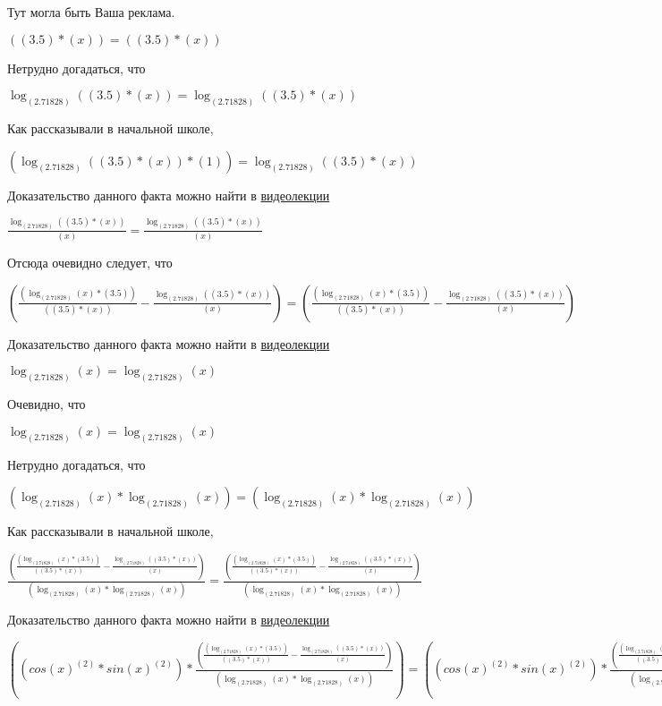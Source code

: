 \documentclass[12pt,a4paper,fleqn]{article}
\theoremstyle{definition}
\begin{document}
Тут могла быть Ваша реклама.

$(( 3.5 ) * ( x )) = (( 3.5 ) * ( x ))$

Нетрудно догадаться, что

$\log_{( 2.71828 )}{(( 3.5 ) * ( x ))} = \log_{( 2.71828 )}{(( 3.5 ) * ( x ))}$

Как рассказывали в начальной школе,

$(\log_{( 2.71828 )}{(( 3.5 ) * ( x ))} * ( 1 )) = \log_{( 2.71828 )}{(( 3.5 ) * ( x ))}$

Доказательство данного факта можно найти в \href{https://www.youtube.com/watch?v=dQw4w9WgXcQ}{видеолекции}

$\frac{\log_{( 2.71828 )}{(( 3.5 ) * ( x ))}}{( x )}
 = \frac{\log_{( 2.71828 )}{(( 3.5 ) * ( x ))}}{( x )}
$

Отсюда очевидно следует, что

$(\frac{(\log_{( 2.71828 )}{( x )} * ( 3.5 ))}{(( 3.5 ) * ( x ))}
 - \frac{\log_{( 2.71828 )}{(( 3.5 ) * ( x ))}}{( x )}
) = (\frac{(\log_{( 2.71828 )}{( x )} * ( 3.5 ))}{(( 3.5 ) * ( x ))}
 - \frac{\log_{( 2.71828 )}{(( 3.5 ) * ( x ))}}{( x )}
)$

Доказательство данного факта можно найти в \href{https://www.youtube.com/watch?v=dQw4w9WgXcQ}{видеолекции}

$\log_{( 2.71828 )}{( x )} = \log_{( 2.71828 )}{( x )}$

Очевидно, что

$\log_{( 2.71828 )}{( x )} = \log_{( 2.71828 )}{( x )}$

Нетрудно догадаться, что

$(\log_{( 2.71828 )}{( x )} * \log_{( 2.71828 )}{( x )}) = (\log_{( 2.71828 )}{( x )} * \log_{( 2.71828 )}{( x )})$

Как рассказывали в начальной школе,

$\frac{(\frac{(\log_{( 2.71828 )}{( x )} * ( 3.5 ))}{(( 3.5 ) * ( x ))}
 - \frac{\log_{( 2.71828 )}{(( 3.5 ) * ( x ))}}{( x )}
)}{(\log_{( 2.71828 )}{( x )} * \log_{( 2.71828 )}{( x )})}
 = \frac{(\frac{(\log_{( 2.71828 )}{( x )} * ( 3.5 ))}{(( 3.5 ) * ( x ))}
 - \frac{\log_{( 2.71828 )}{(( 3.5 ) * ( x ))}}{( x )}
)}{(\log_{( 2.71828 )}{( x )} * \log_{( 2.71828 )}{( x )})}
$

Доказательство данного факта можно найти в \href{https://www.youtube.com/watch?v=dQw4w9WgXcQ}{видеолекции}

$((cos{( x )}^{( 2 )} * sin{( x )}^{( 2 )}) * \frac{(\frac{(\log_{( 2.71828 )}{( x )} * ( 3.5 ))}{(( 3.5 ) * ( x ))}
 - \frac{\log_{( 2.71828 )}{(( 3.5 ) * ( x ))}}{( x )}
)}{(\log_{( 2.71828 )}{( x )} * \log_{( 2.71828 )}{( x )})}
) = ((cos{( x )}^{( 2 )} * sin{( x )}^{( 2 )}) * \frac{(\frac{(\log_{( 2.71828 )}{( x )} * ( 3.5 ))}{(( 3.5 ) * ( x ))}
 - \frac{\log_{( 2.71828 )}{(( 3.5 ) * ( x ))}}{( x )}
)}{(\log_{( 2.71828 )}{( x )} * \log_{( 2.71828 )}{( x )})}
)$
\end{document}
